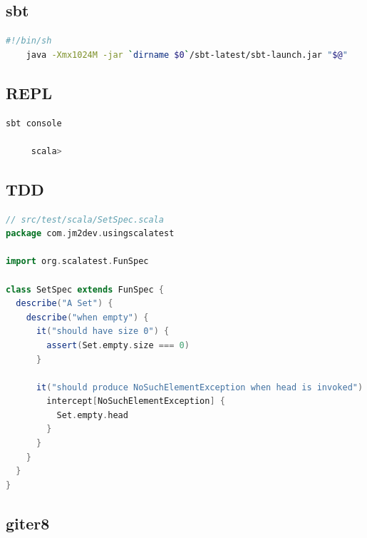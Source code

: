 \documentclass[utf8,utf8x]{beamer}
\begin{document}
\subsection{sbt}
\begin{frame}[fragile]
  \begin{lstlisting}[language=bash]
    #!/bin/sh    
    java -Xmx1024M -jar `dirname $0`/sbt-latest/sbt-launch.jar "$@" 
  \end{lstlisting} \cite{sbt}
\end{frame}

\subsection{REPL}
\begin{frame}[fragile]
  \begin{lstlisting}[language=bash]
     sbt console

     scala> 
  \end{lstlisting} \cite{sbt}
\end{frame}

\subsection{TDD}
\begin{frame}[fragile]
  \begin{lstlisting}[language=scala]
    // src/test/scala/SetSpec.scala
package com.jm2dev.usingscalatest

import org.scalatest.FunSpec

class SetSpec extends FunSpec {
  describe("A Set") {
    describe("when empty") {
      it("should have size 0") {
        assert(Set.empty.size === 0)
      }

      it("should produce NoSuchElementException when head is invoked") {
        intercept[NoSuchElementException] {
          Set.empty.head
        }
      }
    }
  }
}    
  \end{lstlisting} \cite{sbt}
\end{frame}

\subsection{giter8}
\end{document}
